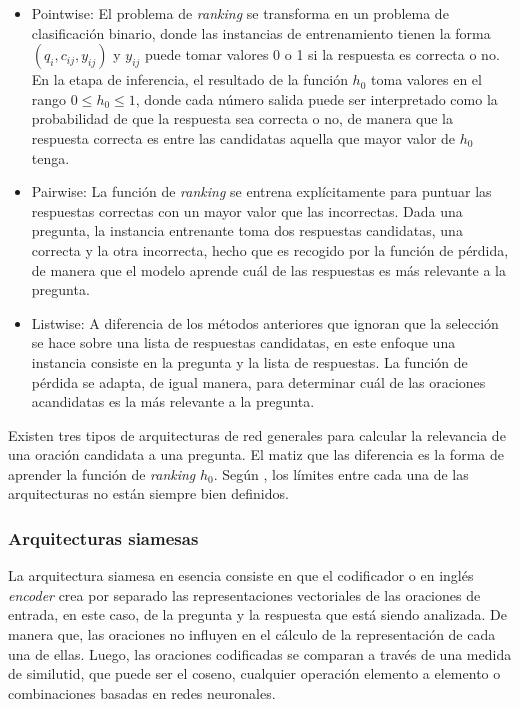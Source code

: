 \begin{itemize}
	\item Pointwise: El problema de \textit{ranking} se transforma en un problema de clasificación binario, donde las instancias de entrenamiento tienen la forma $(q_{i}, c_{ij}, y_{ij})$ y $y_{ij}$ puede tomar valores 0 o 1 si la respuesta es correcta o no. En la etapa de inferencia, el resultado de la función $h_{0}$ toma valores en el rango $0 \leq h_{0} \leq 1$, donde cada número salida puede ser interpretado como la probabilidad de que la respuesta sea correcta o no, de manera que la respuesta correcta es entre las candidatas aquella que mayor valor de $h_0$ tenga.
	\item Pairwise: La función de \textit{ranking} se entrena explícitamente para puntuar las respuestas correctas con un mayor valor que las incorrectas. Dada una pregunta, la instancia entrenante toma dos respuestas candidatas, una correcta y la otra incorrecta, hecho que es recogido por la función de pérdida, de manera que el modelo aprende cuál de las respuestas es más relevante a la pregunta. 
	\item Listwise: A diferencia de los métodos anteriores que ignoran que la selección se hace sobre una lista de respuestas candidatas, en este enfoque una instancia consiste en la pregunta y la lista de respuestas. La función de pérdida se adapta, de igual manera, para determinar cuál de las oraciones acandidatas es la más relevante a la pregunta.
\end{itemize}

Existen tres tipos de arquitecturas de red generales para calcular la relevancia de una oración candidata a una pregunta. El matiz que las diferencia es la forma de aprender la función de \textit{ranking} $h_{0}$. Según \cite{2018-lai-review}, los límites entre cada una de las arquitecturas no están siempre bien definidos.

\subsubsection{Arquitecturas siamesas}

La arquitectura siamesa en esencia consiste en que el codificador o en inglés \textit{encoder} crea por separado las representaciones vectoriales de las oraciones de entrada, en este caso, de la pregunta y la respuesta que está siendo analizada. De manera que, las oraciones no influyen en el cálculo de la representación de cada una de ellas. Luego, las oraciones codificadas se comparan a través de una medida de similutid, que puede ser el coseno, cualquier operación elemento a elemento o combinaciones basadas en redes neuronales. 

